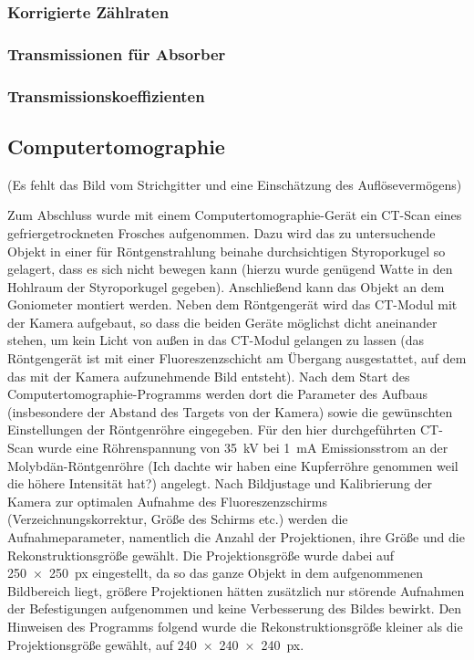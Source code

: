\documentclass[11pt, a4paper]{article}
\numberwithin{equation}{section}
\newcommand{\korr}[1]{{\color{red}(#1)}}
\begin{document}
\subsubsection{Korrigierte Zählraten}

\subsubsection{Transmissionen für Absorber}

\subsubsection{Transmissionskoeffizienten}

\subsection{Computertomographie}
\korr{Es fehlt das Bild vom Strichgitter und eine Einschätzung des Auflösevermögens}


Zum Abschluss wurde mit einem Computertomographie-Gerät ein CT-Scan eines gefriergetrockneten Frosches aufgenommen.
Dazu wird das zu untersuchende Objekt in einer für Röntgenstrahlung beinahe durchsichtigen Styroporkugel so gelagert, dass es sich nicht bewegen kann (hierzu wurde genügend Watte in den Hohlraum der Styroporkugel gegeben).
Anschließend kann das Objekt an dem Goniometer montiert werden.
Neben dem Röntgengerät wird das CT-Modul mit der Kamera aufgebaut, so dass die beiden Geräte möglichst dicht aneinander stehen, um kein Licht von außen in das CT-Modul gelangen zu lassen (das Röntgengerät ist mit einer Fluoreszenzschicht am Übergang ausgestattet, auf dem das mit der Kamera aufzunehmende Bild entsteht).
Nach dem Start des Computertomographie-Programms werden dort die Parameter des Aufbaus (insbesondere der Abstand des Targets von der Kamera) sowie die gewünschten Einstellungen der Röntgenröhre eingegeben.
Für den hier durchgeführten CT-Scan wurde eine Röhrenspannung von \SI{35}{\kilo\volt} bei \SI{1}{\milli\ampere} Emissionsstrom an der Molybdän-Röntgenröhre \korr{Ich dachte wir haben eine Kupferröhre genommen weil die höhere Intensität hat?} angelegt.
Nach Bildjustage und Kalibrierung der Kamera zur optimalen Aufnahme des Fluoreszenzschirms (Verzeichnungskorrektur, Größe des Schirms etc.) werden die Aufnahmeparameter, namentlich die Anzahl der Projektionen, ihre Größe und die Rekonstruktionsgröße gewählt.
Die Projektionsgröße wurde dabei auf \SI{250x250}{px} eingestellt, da so das ganze Objekt in dem aufgenommenen Bildbereich liegt, größere Projektionen hätten zusätzlich nur störende Aufnahmen der Befestigungen aufgenommen und keine Verbesserung des Bildes bewirkt.
Den Hinweisen des Programms folgend wurde die Rekonstruktionsgröße kleiner als die Projektionsgröße gewählt, auf \SI{240x240x240}{px}.
\end{document}
